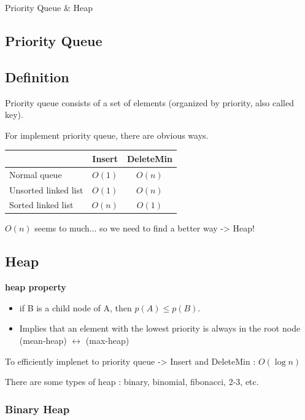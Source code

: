 \begin{section}
    {Priority Queue \& Heap}
\section*{Priority Queue}

\subsection*{Definition}

Priority queue consists of a set of elements (organized by priority, also called key).

For implement priority queue, there are obvious ways.
\begin{center}
    \begin{tabular}{p{5cm}cc}
        \hline
        & Insert & DeleteMin \\
        \hline
        Normal queue & $O(1)$ & $O(n)$ \\
        Unsorted linked list & $O(1)$ & $O(n)$ \\
        Sorted linked list & $O(n)$ & $O(1)$ \\
        \hline
    \end{tabular}
\end{center}

$O(n)$ seems to much... so we need to find a better way -> Heap!

\subsection*{Heap}

\textbf{heap property}
\begin{itemize}
    \item if B is a child node of A, then $p(A) \le p(B)$.
    \item Implies that an element with the lowest priority is always in the root node (mean-heap) $\leftrightarrow$ (max-heap)
\end{itemize}

To efficiently implenet to priority queue -> Insert and DeleteMin : $O(\log n)$

There are some types of heap : binary, binomial, fibonacci, 2-3, etc.

\subsubsection*{Binary Heap}


\end{section}
